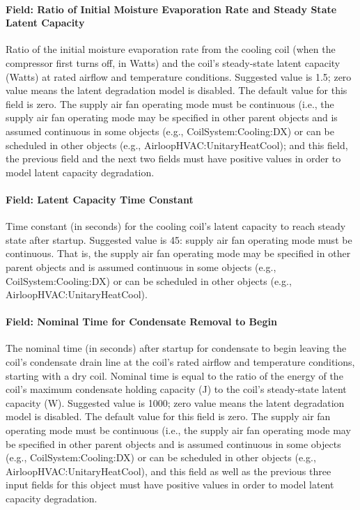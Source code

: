 \paragraph{Field: Ratio of Initial Moisture Evaporation Rate and Steady State Latent Capacity}\label{field-ratio-of-initial-moisture-evaporation-rate-and-steady-state-latent-capacity}

Ratio of the initial moisture evaporation rate from the cooling coil (when the compressor first turns off, in Watts) and the coil's steady-state latent capacity (Watts) at rated airflow and temperature conditions. Suggested value is 1.5; zero value means the latent degradation model is disabled. The default value for this field is zero. The supply air fan operating mode must be continuous (i.e., the supply air fan operating mode may be specified in other parent objects and is assumed continuous in some objects (e.g., CoilSystem:Cooling:DX) or can be scheduled in other objects (e.g., AirloopHVAC:UnitaryHeatCool); and this field, the previous field and the next two fields must have positive values in order to model latent capacity degradation.

\paragraph{Field: Latent Capacity Time Constant}\label{field-latent-capacity-time-constant}

Time constant (in seconds) for the cooling coil's latent capacity to reach steady state after startup. Suggested value is 45: supply air fan operating mode must be continuous. That is, the supply air fan operating mode may be specified in other parent objects and is assumed continuous in some objects (e.g., CoilSystem:Cooling:DX) or can be scheduled in other objects (e.g., AirloopHVAC:UnitaryHeatCool).

\paragraph{Field: Nominal Time for Condensate Removal to Begin}\label{field-nominal-time-for-condensate-removal-to-begin}

The nominal time (in seconds) after startup for condensate to begin leaving the coil's condensate drain line at the coil's rated airflow and temperature conditions, starting with a dry coil. Nominal time is equal to the ratio of the energy of the coil's maximum condensate holding capacity (J) to the coil's steady-state latent capacity (W). Suggested value is 1000; zero value means the latent degradation model is disabled. The default value for this field is zero. The supply air fan operating mode must be continuous (i.e., the supply air fan operating mode may be specified in other parent objects and is assumed continuous in some objects (e.g., CoilSystem:Cooling:DX) or can be scheduled in other objects (e.g., AirloopHVAC:UnitaryHeatCool), and this field as well as the previous three input fields for this object must have positive values in order to model latent capacity degradation.

